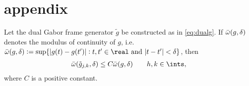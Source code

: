 \section{appendix}

\begin{lem} \label{lem:modtg}
  Let the dual Gabor frame generator $\tilde{g}$ be constructed as in \eqref{eq:dualg}. If ${\bar{\omega}}({g},\delta)$ denotes the modulus of continuity of $g$, i.e. $\modc{g}{\delta} := \sup \{|g(t) - g(t')| : t,t' \in \real \text{ and } |t -t'| < \delta\}$,  then   
  \begin{align}
    \modc{\tilde{g}_{j,k}}{\delta} \le C \modc{g}{\delta} \qquad  \hkints\notag,
    \label{}
  \end{align}
  where $C$ is a positive constant.
\end{lem}
